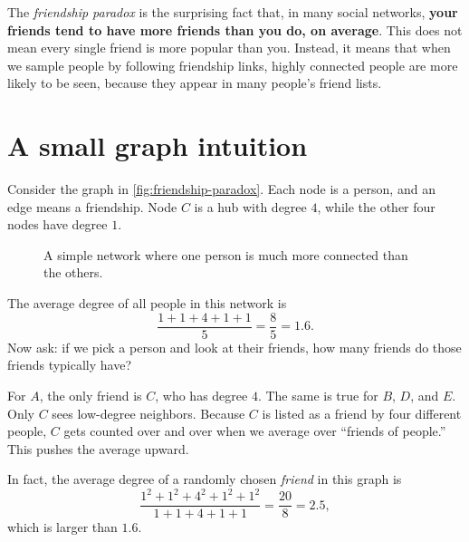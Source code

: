 \begin{eg}
    The \emph{friendship paradox} is the surprising fact that, in many social networks,
\textbf{your friends tend to have more friends than you do, on average}. This does not
mean every single friend is more popular than you. Instead, it means that when we sample
people by following friendship links, highly connected people are more likely to be seen,
because they appear in many people's friend lists.

\section*{A small graph intuition}

Consider the graph in \autoref{fig:friendship-paradox}. Each node is a person, and an
edge means a friendship. Node $C$ is a hub with degree $4$, while the other four nodes
have degree $1$.

\begin{figure}[H]
    \centering
    \caption{A simple network where one person is much more connected than the others.}
    \label{fig:friendship-paradox}
\end{figure}

The average degree of all people in this network is
\[
\frac{1+1+4+1+1}{5} = \frac{8}{5} = 1.6.
\]
Now ask: if we pick a person and look at their friends, how many friends do those friends
typically have?

For $A$, the only friend is $C$, who has degree $4$. The same is true for $B$, $D$, and
$E$. Only $C$ sees low-degree neighbors. Because $C$ is listed as a friend by four
different people, $C$ gets counted over and over when we average over ``friends of
people.'' This pushes the average upward.

In fact, the average degree of a randomly chosen \emph{friend} in this graph is
\[
\frac{1^2 + 1^2 + 4^2 + 1^2 + 1^2}{1+1+4+1+1}
= \frac{20}{8} = 2.5,
\]
which is larger than $1.6$.


\end{eg}
